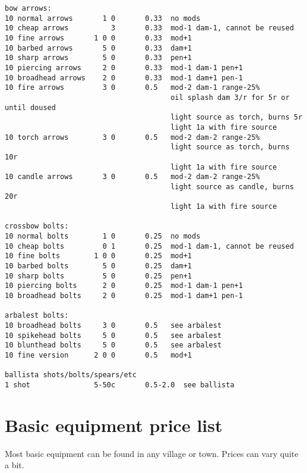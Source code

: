 \begin{verbatim}
bow arrows:
10 normal arrows       1 0       0.33  no mods
10 cheap arrows          3       0.33  mod-1 dam-1, cannot be reused
10 fine arrows       1 0 0       0.33  mod+1
10 barbed arrows       5 0       0.33  dam+1
10 sharp arrows        5 0       0.33  pen+1
10 piercing arrows     2 0       0.33  mod-1 dam-1 pen+1
10 broadhead arrows    2 0       0.33  mod-1 dam+1 pen-1
10 fire arrows         3 0       0.5   mod-2 dam-1 range-25%
                                       oil splash dam 3/r for 5r or until doused
                                       light source as torch, burns 5r
                                       light 1a with fire source
10 torch arrows        3 0       0.5   mod-2 dam-2 range-25%
                                       light source as torch, burns 10r
                                       light 1a with fire source
10 candle arrows       3 0       0.5   mod-2 dam-2 range-25%
                                       light source as candle, burns 20r
                                       light 1a with fire source

crossbow bolts:
10 normal bolts        1 0       0.25  no mods
10 cheap bolts         0 1       0.25  mod-1 dam-1, cannot be reused
10 fine bolts        1 0 0       0.25  mod+1
10 barbed bolts        5 0       0.25  dam+1
10 sharp bolts         5 0       0.25  pen+1
10 piercing bolts      2 0       0.25  mod-1 dam-1 pen+1
10 broadhead bolts     2 0       0.25  mod-1 dam+1 pen-1

arbalest bolts:
10 broadhead bolts     3 0       0.5   see arbalest
10 spikehead bolts     5 0       0.5   see arbalest
10 blunthead bolts     5 0       0.5   see arbalest
10 fine version      2 0 0       0.5   mod+1

ballista shots/bolts/spears/etc
1 shot               5-50c       0.5-2.0  see ballista
\end{verbatim} \normalsize








\section*{Basic equipment price list}
\label{sec:basicequipmentpricelist}

Most basic equipment can be found in any village or town. Prices can vary quite a bit.


